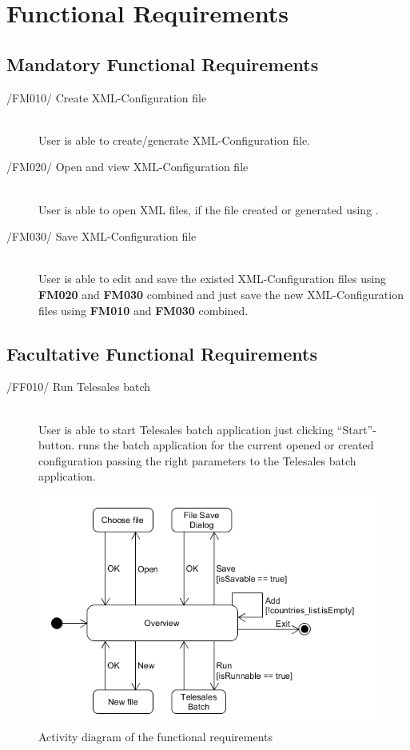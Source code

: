 \section{Functional Requirements}

\subsection{Mandatory Functional Requirements}
\begin{description}
\item[/FM010/ Create XML-Configuration file]\hfill\\ User is able to create/generate XML-Configuration file.
\item[/FM020/ Open and view XML-Configuration file]\hfill\\ User is able to open XML files, if the file created or generated using \app{}.
\item[/FM030/ Save XML-Configuration file]\hfill\\ User is able to edit and save the existed XML-Configuration files using \textbf{FM020} and \textbf{FM030} combined and just save the new XML-Configuration files using \textbf{FM010} and \textbf{FM030} combined.
\end{description}

\subsection{Facultative Functional Requirements}
\begin{description}
\item[/FF010/ Run Telesales batch]\hfill\\ User is able to start Telesales batch application just clicking ``Start''-button. \app{} runs the batch application for the current opened or created configuration passing the right parameters to the Telesales batch application.
\end{description}

\begin{figure}[h!]
\centering
\includegraphics[width=\textwidth]{d_activity.png}
\caption{Activity diagram of the functional requirements}
\end{figure}
